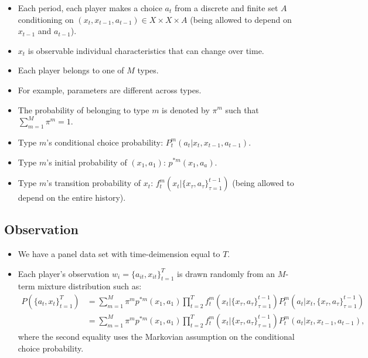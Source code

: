 \documentclass[]{book}
\providecommand{\tightlist}{%
  \setlength{\itemsep}{0pt}\setlength{\parskip}{0pt}}
\begin{document}
\begin{itemize}
\tightlist
\item
  Each period, each player makes a choice \(a_t\) from a discrete and
  finite set \(A\) conditioning on
  \((x_t, x_{t - 1}, a_{t - 1}) \in X \times X \times A\) (being allowed
  to depend on \(x_{t - 1}\) and \(a_{t - 1}\)).
\item
  \(x_t\) is observable individual characteristics that can change over
  time.
\item
  Each player belongs to one of \(M\) types.
\item
  For example, parameters are different across types.
\item
  The probability of belonging to type \(m\) is denoted by \(\pi^m\)
  such that \(\sum_{m = 1}^M \pi^m = 1\).
\item
  Type \(m\)'s conditional choice probability:
  \(P_t^m(a_t|x_t, x_{t - 1}, a_{t - 1})\).
\item
  Type \(m\)'s initial probability of \((x_1, a_1)\):
  \(p^{*m}(x_1, a_a)\).
\item
  Type \(m\)'s transition probability of \(x_t\):
  \(f_t^m(x_t|\{x_{\tau}, a_{\tau}\}_{\tau = 1}^{t - 1})\) (being
  allowed to depend on the entire history).
\end{itemize}

\subsection{Observation}\label{observation}

\begin{itemize}
\tightlist
\item
  We have a panel data set with time-deimension equal to \(T\).
\item
  Each player's observation \(w_i = \{a_{it}, x_{it}\}_{t = 1}^T\) is
  drawn randomly from an \(M\)-term mixture distribution such as: \[
  \begin{split}
  P(\{a_t, x_t\}_{t = 1}^T) &= \sum_{m = 1}^M \pi^m p^{*m}(x_1, a_1) \prod_{t = 2}^T f_t^m(x_t|\{x_\tau, a_\tau\}_{\tau = 1}^{t - 1}) P_t^m(a_t| x_t, \{x_\tau, a_\tau\}_{\tau = 1}^{t - 1})\\
  &= \sum_{m = 1}^M \pi^m p^{*m}(x_1, a_1) \prod_{t = 2}^T f_t^m(x_t|\{x_\tau, a_\tau\}_{\tau = 1}^{t - 1}) P_t^m(a_t| x_t, x_{t - 1}, a_{t - 1}),
  \end{split}
  \] where the second equality uses the Markovian assumption on the
  conditional choice probability.
\end{itemize}
\end{document}
